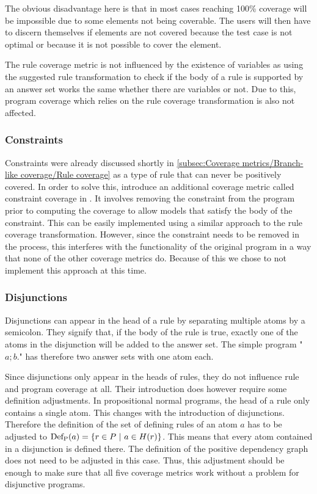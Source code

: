 The obvious disadvantage here is that in most cases reaching 100\% coverage will be impossible due to some elements not being coverable. The users will then have to discern themselves if elements are not covered because the test case is not optimal or because it is not possible to cover the element.

The rule coverage metric is not influenced by the existence of variables as using the suggested rule transformation to check if the body of a rule is supported by an answer set works the same whether there are variables or not. Due to this, program coverage which relies on the rule coverage transformation is also not affected.

\subsubsection{Constraints}
\label{subsubsec:Coverage for further program classes/Language constructs/Constraints}
Constraints were already discussed shortly in \cref{subsec:Coverage metrics/Branch-like coverage/Rule coverage} as a type of rule that can never be positively covered. In order to solve this, \citeauthor{Jan+11} introduce an additional coverage metric called constraint coverage in \cite{Jan+11}. It involves removing the constraint from the program prior to computing the coverage to allow models that satisfy the body of the constraint. This can be easily implemented using a similar approach to the rule coverage transformation. However, since the constraint needs to be removed in the process, this interferes with the functionality of the original program in a way that none of the other coverage metrics do. Because of this we chose to not implement this approach at this time.

\subsubsection{Disjunctions}
\label{subsubsec:Coverage for further program classes/Language constructs/Disjunctions}
Disjunctions can appear in the head of a rule by separating multiple atoms by a semicolon. They signify that, if the body of the rule is true, exactly one of the atoms in the disjunction will be added to the answer set. The simple program "\(a ; b.\)" has therefore two answer sets with one atom each.

Since disjunctions only appear in the heads of rules, they do not influence rule and program coverage at all. Their introduction does however require some definition adjustments. In propositional normal programs, the head of a rule only contains a single atom. This changes with the introduction of disjunctions. Therefore the definition of the set of defining rules of an atom $a$ has to be adjusted to \(\Def(a) = \{r \in P\ |\ a \in H(r)\}\). This means that every atom contained in a disjunction is defined there. The definition of the positive dependency graph does not need to be adjusted in this case. Thus, this adjustment should be enough to make sure that all five coverage metrics work without a problem for disjunctive programs. 

